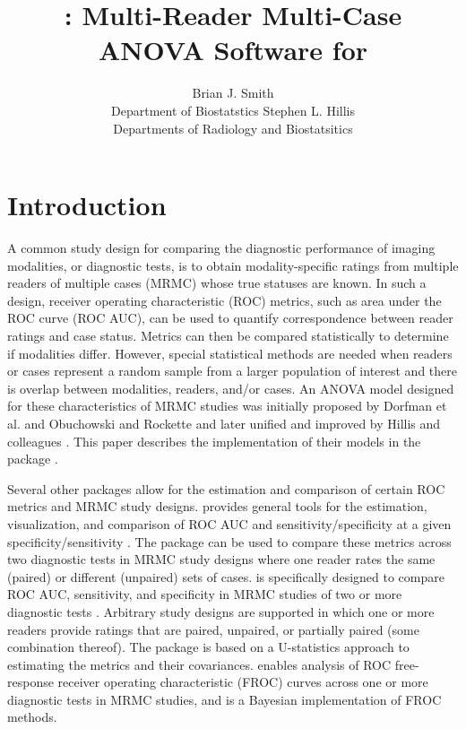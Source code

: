 \documentclass[
]{jss}
\author{
Brian J. Smith\\Department of Biostatstics \And Stephen L.
Hillis\\Departments of Radiology and Biostatsitics
}
\title{\pkg{MRMCaov}: Multi-Reader Multi-Case ANOVA Software for
\proglang{R}}
\begin{document}
\hypertarget{introduction}{%
\section{Introduction}\label{introduction}}

A common study design for comparing the diagnostic performance of
imaging modalities, or diagnostic tests, is to obtain modality-specific
ratings from multiple readers of multiple cases (MRMC) whose true
statuses are known. In such a design, receiver operating characteristic
(ROC) metrics, such as area under the ROC curve (ROC AUC), can be used
to quantify correspondence between reader ratings and case status.
Metrics can then be compared statistically to determine if modalities
differ. However, special statistical methods are needed when readers or
cases represent a random sample from a larger population of interest and
there is overlap between modalities, readers, and/or cases. An ANOVA
model designed for these characteristics of MRMC studies was initially
proposed by Dorfman et al. \citep{Dorfman:1992:ROC} and Obuchowski and
Rockette \citep{Obuchowski:1995:HTD} and later unified and improved by
Hillis and colleagues
\citep{Hillis:2005:CDB, Hillis:2007:CDD, Hillis:2008:RDD, Hillis:2018:RRM}.
This paper describes the implementation of their models in the
  package \citep{MRMCaov-package}.

Several other  packages allow for the estimation and
comparison of certain ROC metrics and MRMC study designs. 
provides general tools for the estimation, visualization, and comparison
of ROC AUC and sensitivity/specificity at a given
specificity/sensitivity \citep{Robin:2011:pROC}. The package can be used
to compare these metrics across two diagnostic tests in MRMC study
designs where one reader rates the same (paired) or different (unpaired)
sets of cases.  is specifically designed to compare ROC AUC,
sensitivity, and specificity in MRMC studies of two or more diagnostic
tests \citep{Gallas:2022:iMRMC}. Arbitrary study designs are supported
in which one or more readers provide ratings that are paired, unpaired,
or partially paired (some combination thereof). The package is based on
a U-statistics approach to estimating the metrics and their covariances.
 enables analysis of ROC free-response receiver operating
characteristic (FROC) curves across one or more diagnostic tests in MRMC
studies, and  is a Bayesian implementation of FROC
methods.
\end{document}
